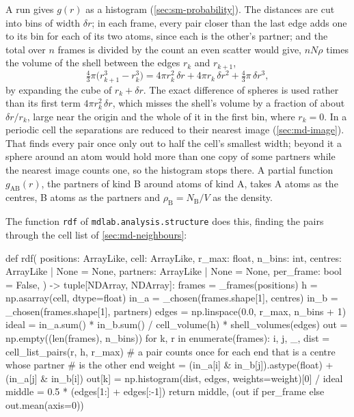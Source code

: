 A run gives $g(r)$ as a histogram (\cref{sec:sm-probability}). The
distances are cut into bins of width $\delta r$; in each frame, every pair
closer than the last edge adds one to its bin for each of its two atoms,
since each is the other's partner; and the total over $n$ frames is
divided by the count an even scatter would give, $nN\rho$ times the volume
of the shell between the edges $r_k$ and $r_{k+1}$,
\begin{equation*}
   \tfrac43\pi\bigl(r_{k+1}^3 - r_k^3\bigr)
   = 4\pi r_k^2\,\delta r + 4\pi r_k\,\delta r^2
   + \tfrac43\pi\,\delta r^3 ,
\end{equation*}
by expanding the cube of $r_k + \delta r$. The exact difference of
spheres is used rather than its first term $4\pi r_k^2\,\delta r$, which
misses the shell's volume by a fraction of about $\delta r/r_k$, large near
the origin and the whole of it in the first bin, where $r_k = 0$. In a
periodic cell the separations are reduced to their nearest image
(\cref{sec:md-image}). That finds every pair once only out to half the
cell's smallest width; beyond it a sphere around an atom would hold more
than one copy of some partners while the nearest image counts one, so the
histogram stops there. A partial function $g_{\mathrm{AB}}(r)$, the
partners of kind B around atoms of kind A, takes A atoms as the centres,
B atoms as the partners and $\rho_{\mathrm B} = N_{\mathrm B}/V$ as the
density.

The function \texttt{rdf} of \texttt{mdlab.analysis.structure} does this,
finding the pairs through the cell list of \cref{sec:md-neighbours}:

\begin{code}
def rdf(
    positions: ArrayLike,
    cell: ArrayLike,
    r_max: float,
    n_bins: int,
    centres: ArrayLike | None = None,
    partners: ArrayLike | None = None,
    per_frame: bool = False,
) -> tuple[NDArray, NDArray]:
    frames = _frames(positions)
    h = np.asarray(cell, dtype=float)
    in_a = _chosen(frames.shape[1], centres)
    in_b = _chosen(frames.shape[1], partners)
    edges = np.linspace(0.0, r_max, n_bins + 1)
    ideal = in_a.sum() * in_b.sum() / cell_volume(h) * shell_volumes(edges)
    out = np.empty((len(frames), n_bins))
    for k, r in enumerate(frames):
        i, j, _, dist = cell_list_pairs(r, h, r_max)
        # a pair counts once for each end that is a centre whose partner
        # is the other end
        weight = (in_a[i] & in_b[j]).astype(float) + (in_a[j] & in_b[i])
        out[k] = np.histogram(dist, edges, weights=weight)[0] / ideal
    middle = 0.5 * (edges[1:] + edges[:-1])
    return middle, (out if per_frame else out.mean(axis=0))
\end{code}

